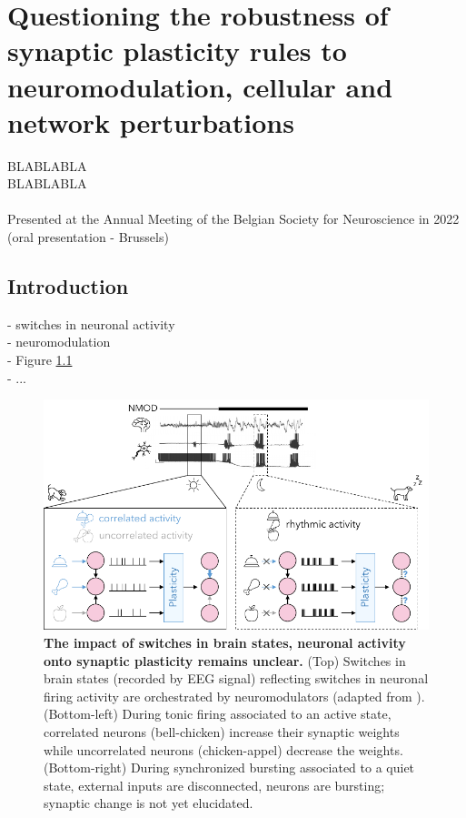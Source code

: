 \chapter{Questioning the robustness of synaptic
plasticity rules to neuromodulation, cellular and
network perturbations}

\begin{shaded}
BLABLABLA\\
BLABLABLA\\
~\\
Presented at the Annual Meeting of the Belgian Society for Neuroscience in 2022 (oral presentation - Brussels)
\end{shaded}

%
%

\section{Introduction}
- switches in neuronal activity\\
- neuromodulation\\
- Figure \ref{fig:intro}\\
- ...\\

\begin{figure}[h!]
    \centering
    \includegraphics{fig/Review/fig_intro.pdf}
    \caption{\textbf{The impact of switches in brain states, neuronal activity onto synaptic plasticity remains unclear.} (Top) Switches in brain states (recorded by EEG signal) reflecting switches in neuronal firing activity are orchestrated by neuromodulators  (adapted from \cite{zagha_neural_2014}). (Bottom-left) During tonic firing associated to an active state, correlated neurons (bell-chicken) increase their synaptic weights while uncorrelated neurons (chicken-appel) decrease the weights. (Bottom-right) During synchronized bursting associated to a quiet state, external inputs are disconnected, neurons are bursting; synaptic change is not yet elucidated.  }
    \label{fig:intro}
\end{figure}



